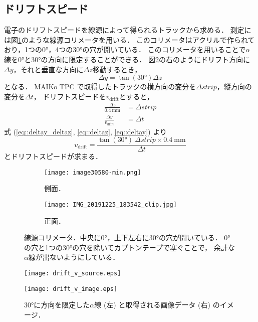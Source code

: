 \documentclass[../master]{subfiles}
\begin{document}
\subsection{ドリフトスピード}
電子のドリフトスピードを線源によって得られるトラックから求める．
測定には図\ref{pic::alpha_collimator}のような線源コリメータを用いる．
このコリメータはアクリルで作られており，1つの\ang{0}，4つの\ang{30}の穴が開いている．
このコリメータを用いることで$\alpha$線を\ang{0}と\ang{30}の方向に限定することができる．
図\ref{fig::drift_v_image}の右のようにドリフト方向に$\Delta y$，それと垂直な方向に$\Delta z$移動するとき，
\begin{equation}
  \Delta y = \tan(\ang{30})\Delta z \label{eq::deltay_deltaz}
\end{equation}
となる．
MAIKo TPC で取得したトラックの横方向の変分を$\Delta strip$，縦方向の変分を$\Delta t$，
ドリフトスピードを$v_{\text{drift}}$とすると，
\begin{align}
  \frac{\Delta z}{\SI{0.4}{\milli\metre}} & = \Delta strip \label{eq::deltaz}\\
  \frac{\Delta y}{v_{\text{drift}}} & = \Delta t \label{eq::deltay}
\end{align}
式 (\ref{eq::deltay_deltaz}, \ref{eq::deltaz}, \ref{eq::deltay}) より
\begin{equation}
  v_{\text{drift}} = \frac{\tan(\ang{30})~\Delta strip\times\SI{0.4}{\milli\metre}}{\Delta t}
\end{equation}
とドリフトスピードが求まる．
\begin{figure}
  \centering
  \begin{subfigure}{0.45\columnwidth}
    \centering
    \texttt{[image: image30580-min.png]}
    \caption{側面．}
  \end{subfigure}
  \begin{subfigure}{0.45\columnwidth}
    \centering
    \texttt{[image: IMG\_20191225\_183542\_clip.jpg]}
    \caption{正面．}
  \end{subfigure}
  \caption[線源コリメータ．]
          {線源コリメータ．中央に\ang{0}，上下左右に\ang{30}の穴が開いている．
            \ang{0}の穴と1つの\ang{30}の穴を除いてカプトンテープで塞ぐことで，
            余計な$\alpha$線が出ないようにしている．
          }
          \label{pic::alpha_collimator}
\end{figure}
\begin{figure}
  \centering
  \begin{minipage}{0.45\columnwidth}
    \centering
    \texttt{[image: drift\_v\_source.eps]}
  \end{minipage}
  \begin{minipage}{0.45\columnwidth}
    \centering
    \texttt{[image: drift\_v\_image.eps]}
  \end{minipage}
  \caption[\ang{30}に方向を限定した$\alpha$線と取得される画像データのイメージ．]
          {\ang{30}に方向を限定した$\alpha$線 (左) と取得される画像データ (右) のイメージ．}
  \label{fig::drift_v_image}
\end{figure}
\end{document}
